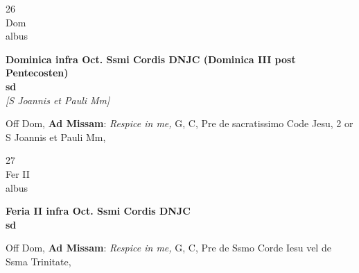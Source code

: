 \documentclass[10pt, openany]{book}
\begin{document}
        \begin{center}
            \begin{minipage}{3.5in}
                \vspace{2em}
                \begin{minipage}{0.5in}
                    {\Huge 26} \\
                    {\normalsize Dom} \\
                    {\normalsize albus}
                \end{minipage}
                \begin{minipage}{3.0in}
                    \textbf{ \large Dominica infra Oct. Ssmi Cordis DNJC (Dominica III post Pentecosten) \\
                    \textnormal{\normalsize sd}} \\ \textit{[S Joannis et Pauli Mm]} \\ 
                \end{minipage}
                \begin{justify}Off Dom, \textbf{Ad Missam}: \textit{Respice in me,} G, C, Pre de sacratissimo Code Jesu, 2 or S Joannis et Pauli Mm,   
                \end{justify}
            \end{minipage}
        \end{center}
    
        \begin{center}
            \begin{minipage}{3.5in}
                \vspace{2em}
                \begin{minipage}{0.5in}
                    {\Huge 27} \\
                    {\normalsize Fer II} \\
                    {\normalsize albus}
                \end{minipage}
                \begin{minipage}{3.0in}
                    \textbf{ \large Feria II infra Oct. Ssmi Cordis DNJC \\
                    \textnormal{\normalsize sd}} \\ 
                \end{minipage}
                \begin{justify}Off Dom, \textbf{Ad Missam}: \textit{Respice in me,} G, C, Pre de Ssmo Corde Iesu vel de Ssma Trinitate,   
                \end{justify}
            \end{minipage}
        \end{center}
    
\end{document}
